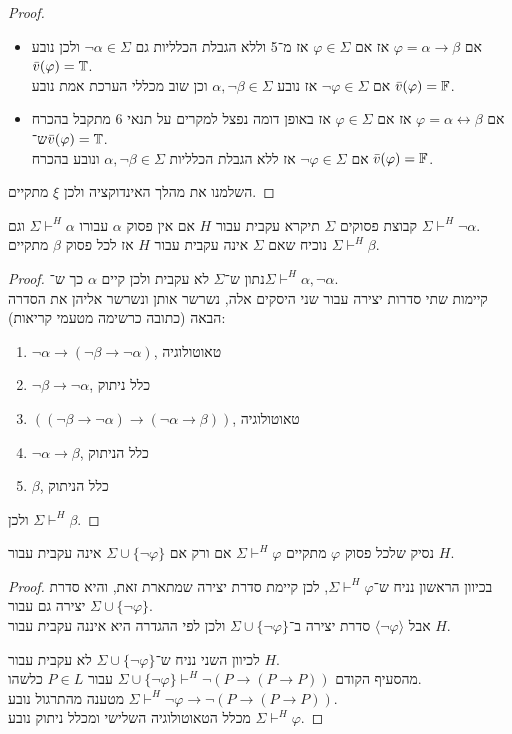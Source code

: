\begin{proof}
\begin{itemize}
		\item אם $\varphi = \alpha \to \beta$ אז אם $\varphi \in \Sigma$ אז מ־5 וללא הגבלת הכלליות גם $\lnot \alpha \in \Sigma$ ולכן נובע $\bar{v}(\varphi) = \mathbb{T}$. \\
			אם $\lnot \varphi \in \Sigma$ אז נובע $\alpha, \lnot \beta \in \Sigma$ וכן שוב מכללי הערכת אמת נובע $\bar{v}(\varphi) = \mathbb{F}$.
		\item אם $\varphi = \alpha \leftrightarrow \beta$ אז אם $\varphi \in \Sigma$ אז באופן דומה נפצל למקרים על תנאי 6 מתקבל בהכרח ש־$\bar{v}(\varphi) = \mathbb{T}$. \\
			אם $\lnot \varphi \in \Sigma$ אז ללא הגבלת הכלליות $\alpha, \lnot \beta \in \Sigma$ ונובע בהכרח $\bar{v}(\varphi) = \mathbb{F}$.
	\end{itemize}
	השלמנו את מהלך האינדוקציה ולכן $\xi$ מתקיים.
\end{proof}

\question{}
\subquestion[2]
קבוצת פסוקים $\Sigma$ תיקרא עקבית עבור $H$ אם אין פסוק $\alpha$ עבורו $\Sigma \vdash^H \alpha$ וגם $\Sigma \vdash^H \lnot \alpha$. \\
נוכיח שאם $\Sigma$ אינה עקבית עבור $H$ אז לכל פסוק $\beta$ מתקיים $\Sigma \vdash^H \beta$.
\begin{proof}
	נתון ש־$\Sigma$ לא עקבית ולכן קיים $\alpha$ כך ש־$\Sigma \vdash^H \alpha, \lnot \alpha$. \\
	קיימות שתי סדרות יצירה עבור שני היסקים אלה, נשרשר אותן ונשרשר אליהן את הסדרה הבאה (כתובה כרשימה מטעמי קריאות):
	\begin{enumerate}
		\item $\lnot \alpha \to (\lnot \beta \to \lnot \alpha)$, טאוטולוגיה
		\item $\lnot \beta \to \lnot \alpha$, כלל ניתוק
		\item $((\lnot \beta \to \lnot \alpha) \to (\lnot \alpha \to \beta))$, טאוטולוגיה
		\item $\lnot \alpha \to \beta$, כלל הניתוק
		\item $\beta$, כלל הניתוק
	\end{enumerate}
	ולכן $\Sigma \vdash^H \beta$.
\end{proof}

\subquestion{}
נסיק שלכל פסוק $\varphi$ מתקיים $\Sigma \vdash^H \varphi$ אם ורק אם $\Sigma \cup \{ \lnot \varphi \}$ אינה עקבית עבור $H$.
\begin{proof}
	בכיוון הראשון נניח ש־$\Sigma \vdash^H \varphi$, לכן קיימת סדרת יצירה שמתארת זאת, והיא סדרת יצירה גם עבור $\Sigma \cup \{ \lnot \varphi \}$. \\
	אבל $\langle \lnot \varphi \rangle$ סדרת יצירה ב־$\Sigma \cup \{ \lnot \varphi \}$ ולכן לפי ההגדרה היא איננה עקבית עבור $H$.

	לכיוון השני נניח ש־$\Sigma \cup \{ \lnot \varphi \}$ לא עקבית עבור $H$. \\
	מהסעיף הקודם $\Sigma \cup \{ \lnot \varphi \} \vdash^H \lnot (P \to (P \to P))$ עבור $P \in L$ כלשהו. \\
	מטענה מהתרגול נובע $\Sigma \vdash^H \lnot \varphi \to \lnot (P \to (P \to P))$. \\
	מכלל הטאוטולוגיה השלישי ומכלל ניתוק נובע $\Sigma \vdash^H \varphi$.
\end{proof}

